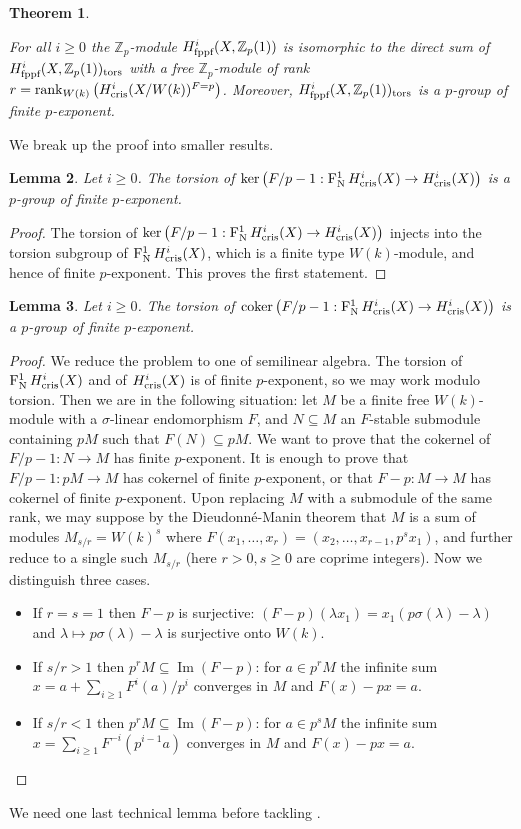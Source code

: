 \documentclass[11pt]{article}
\theoremstyle{plain}
\newtheorem{Thm}{Theorem}[subsection]
\newtheorem{Lem}[Thm]{Lemma}
\theoremstyle{definition}
\theoremstyle{remark}
\numberwithin{equation}{section}
\newenvironment{thm}[1]%
    { \begin{Thm} \label{T:#1}}%
    { \end{Thm} }
\renewcommand{\th}[1]{\begin{thm}{#1} \sl }
\renewcommand{\eth}{\end{thm} }
\newenvironment{lemma}[1]%
    { \begin{Lem} \label{L:#1}}%
    { \end{Lem} }
\newcommand{\lem}[1]{\begin{lemma}{#1} \sl}
\newcommand{\elem}{\end{lemma}}
\newcommand{\prf}{ \begin{proof} }
\newcommand{\epr}{ \end{proof} }
\DeclareMathOperator{\im}{Im}
\newcommand{\Zp}{\mathbb{Z}_p}
\DeclareMathOperator{\rk}{rank}                                          %
\DeclareMathOperator{\coker}{coker}
\newcommand{\W}{W}                                                       %
\newcommand\Hflat[1]{H^{#1}_{\textnormal{fppf}}}                         %
\DeclareMathOperator{\Nyg}{F_N^1}                                      %
\newcommand\Hcris[1]{H^{#1}_{\textnormal{cris}}}                         %
\begin{document}
\th{finiteexponent}

For all $i\ge0$ the $\Zp$-module $\Hflat{i}(X,\Zp(1))$ is isomorphic to the direct sum of $\Hflat{i}(X,\Zp(1))_{\text{tors}}$ with a free $\Zp$-module of rank $r=\rk_{\W(k)}\left(\Hcris{i}(X/\W(k))^{F=p}\right)$. Moreover, $\Hflat{i}(X,\Zp(1))_{\text{tors}}$ is a $p$-group of finite $p$-exponent.

\eth

We break up the proof into smaller results.

\lem{lemma1}
    Let $i\ge0$. The torsion of $\ker\left(F/p-1:\Nyg\Hcris{i}(X)\to\Hcris{i}(X)\right)$ is a $p$-group of finite $p$-exponent.
\elem

\prf

The torsion of $\ker\left(F/p-1:\Nyg\Hcris{i}(X)\to\Hcris{i}(X)\right)$ injects into the torsion subgroup of $\Nyg\Hcris{i}(X)$, which is a finite type $\W(k)$-module, and hence of finite $p$-exponent. This proves the first statement.\epr

\lem{lemma2}
    Let $i\ge0$. The torsion of $\coker\left(F/p-1:\Nyg\Hcris{i}(X)\to\Hcris{i}(X)\right)$
    is a $p$-group of finite $p$-exponent. 
\elem

\prf

We reduce the problem to one of semilinear algebra. The torsion of $\Nyg\Hcris{i}(X)$ and of $\Hcris{i}(X)$ is of finite $p$-exponent, so we may work modulo torsion. Then we are in the following situation: let $M$ be a finite free $\W(k)$-module with a $\sigma$-linear endomorphism $F$, and $N\subseteq M$ an $F$-stable submodule containing $pM$ such that $F(N)\subseteq pM$. We want to prove that the cokernel of $F/p-1:N\to M$ has finite $p$-exponent. It is enough to prove that $F/p-1:pM\to M$ has cokernel of finite $p$-exponent, or that $F-p:M\to M$ has cokernel of finite $p$-exponent. Upon replacing $M$ with a submodule of the same rank, we may suppose by the Dieudonné-Manin theorem that $M$ is a sum of modules $M_{s/r}=\W(k)^s$ where $F(x_1,\dots,x_r)=(x_2,\dots,x_{r-1},p^sx_1)$, and further reduce to a single such $M_{s/r}$ (here $r>0,s\ge0$ are coprime integers). Now we distinguish three cases.
\begin{itemize}
    \item[(1)]If $r=s=1$ then $F-p$ is surjective: $(F-p)(\lambda x_1)=x_1\left(p\sigma(\lambda)-\lambda\right)$ and $\lambda\mapsto p\sigma(\lambda)-\lambda$ is surjective onto $\W(k)$.
    \item[(2)]If $s/r>1$ then $p^rM\subseteq\im(F-p)$: for $a\in p^rM$ the infinite sum $x=a+\sum_{i\ge1}F^i(a)/p^i$ converges in $M$ and $F(x)-px=a$.
    \item[(3)]If $s/r<1$ then $p^rM\subseteq\im(F-p)$: for $a\in p^sM$ the infinite sum $x=\sum_{i\ge1}F^{-i}(p^{i-1}a)$ converges in $M$ and $F(x)-px=a$.
\end{itemize}\epr
We need one last technical lemma before tackling .
\end{document}
